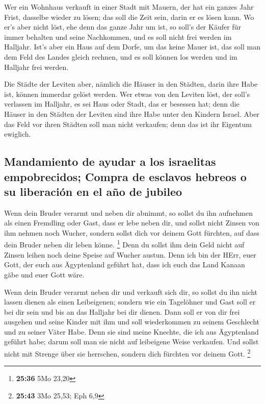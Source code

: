  Wer ein Wohnhaus verkauft in einer Stadt mit Mauern, der
hat ein ganzes Jahr Frist, dasselbe wieder zu lösen; das soll die Zeit
sein, darin er es lösen kann.  Wo er's aber nicht löst,
ehe denn das ganze Jahr um ist, so soll's der Käufer für immer behalten
und seine Nachkommen, und es soll nicht frei werden im Halljahr.
 Ist's aber ein Haus auf dem Dorfe, um das keine Mauer
ist, das soll man dem Feld des Landes gleich rechnen, und es soll können
los werden und im Halljahr frei werden.

 Die Städte der Leviten aber, nämlich die Häuser in den
Städten, darin ihre Habe ist, können immerdar gelöst werden.
 Wer etwas von den Leviten löst, der soll's verlassen im
Halljahr, es sei Haus oder Stadt, das er besessen hat; denn die Häuser
in den Städten der Leviten sind ihre Habe unter den Kindern Israel.
 Aber das Feld vor ihren Städten soll man nicht
verkaufen; denn das ist ihr Eigentum ewiglich.

\hypertarget{mandamiento-de-ayudar-a-los-israelitas-empobrecidos-compra-de-esclavos-hebreos-o-su-liberaciuxf3n-en-el-auxf1o-de-jubileo}{%
\subsection{Mandamiento de ayudar a los israelitas empobrecidos; Compra
de esclavos hebreos o su liberación en el año de
jubileo}\label{mandamiento-de-ayudar-a-los-israelitas-empobrecidos-compra-de-esclavos-hebreos-o-su-liberaciuxf3n-en-el-auxf1o-de-jubileo}}

 Wenn dein Bruder verarmt und neben dir abnimmt, so
sollst du ihn aufnehmen als einen Fremdling oder Gast, dass er lebe
neben dir,  und sollst nicht Zinsen von ihm nehmen noch
Wucher, sondern sollst dich vor deinem Gott fürchten, auf dass dein
Bruder neben dir leben könne. \footnote{\textbf{25:36} 5Mo 23,20}
 Denn du sollst ihm dein Geld nicht auf Zinsen leihen
noch deine Speise auf Wucher austun.  Denn ich bin der
HErr, euer Gott, der euch aus Ägyptenland geführt hat, dass ich euch das
Land Kanaan gäbe und euer Gott wäre.

 Wenn dein Bruder verarmt neben dir und verkauft sich
dir, so sollst du ihn nicht lassen dienen als einen Leibeigenen;
 sondern wie ein Tagelöhner und Gast soll er bei dir sein
und bis an das Halljahr bei dir dienen.  Dann soll er von
dir frei ausgehen und seine Kinder mit ihm und soll wiederkommen zu
seinem Geschlecht und zu seiner Väter Habe.  Denn sie
sind meine Knechte, die ich aus Ägyptenland geführt habe; darum soll man
sie nicht auf leibeigene Weise verkaufen.  Und sollst
nicht mit Strenge über sie herrschen, sondern dich fürchten vor deinem
Gott. \footnote{\textbf{25:43} 3Mo 25,53; Eph 6,9}

